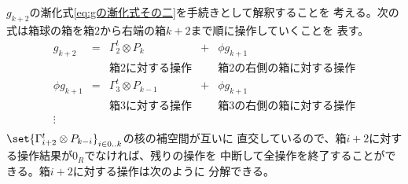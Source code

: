 	$g_{k+2}$の漸化式\eqref{eq:gの漸化式その二}を手続きとして解釈することを
	考える。次の式は箱球の箱を箱$2$から右端の箱$k+2$まで順に操作していくことを
	表す。
	\begin{equation*}\begin{array}{ccccc} %
		g_{k+2} &=& \Gamma_2^t\otimes P_k &+& \phi g_{k+1} \\
		&& \text{箱$2$に対する操作} && \text{箱$2$の右側の箱に対する操作} \\
		\phi g_{k+1} &=& \Gamma_3^t\otimes P_{k-1} &+& \phi g_{k+1} \\
		&& \text{箱$3$に対する操作} && \text{箱$3$の右側の箱に対する操作} \\
		\vdots \\
	\end{array}\end{equation*} %
	$\set{\Gamma_{i+2}^t\otimes P_{k-i}}_{i\in0..k}$の核の補空間が互いに
	直交しているので、箱$i+2$に対する操作結果が$0_R$でなければ、残りの操作を
	中断して全操作を終了することができる。箱$i+2$に対する操作は次のように
	分解できる。
